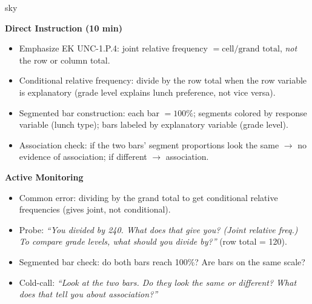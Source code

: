 \documentclass[10pt]{article}
\begin{document}
\begin{skillbox}{sky}
\begin{minipage}[t]{0.48\linewidth}
    \textbf{Direct Instruction (10 min)}
    \begin{itemize}
        \item Emphasize EK UNC-1.P.4: joint relative frequency $= \text{cell} / \text{grand total}$,
              \emph{not} the row or column total.
        \item Conditional relative frequency: divide by the row total when the row
              variable is explanatory (grade level explains lunch preference, not vice versa).
        \item Segmented bar construction: each bar $= 100\%$; segments colored by response
              variable (lunch type); bars labeled by explanatory variable (grade level).
        \item Association check: if the two bars' segment proportions look the same $\to$
              no evidence of association; if different $\to$ association.
    \end{itemize}
\end{minipage}
\hfill
\begin{minipage}[t]{0.48\linewidth}
    \textbf{Active Monitoring}
    \begin{itemize}
        \item Common error: dividing by the grand total to get conditional relative
              frequencies (gives joint, not conditional).
        \item Probe: \textit{``You divided by 240. What does that give you? (Joint relative freq.)
              To compare grade levels, what should you divide by?''} (row total = 120).
        \item Segmented bar check: do both bars reach 100\%? Are bars on the same scale?
        \item Cold-call: \textit{``Look at the two bars. Do they look the same or different?
              What does that tell you about association?''}
    \end{itemize}
\end{minipage}
\end{skillbox}
\end{document}
